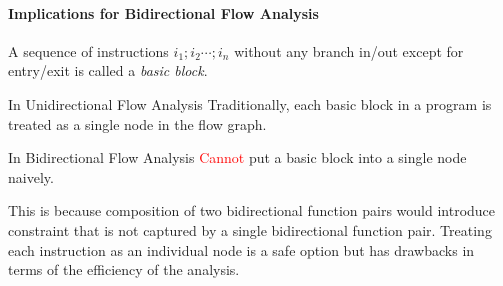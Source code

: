 \documentclass{llncs}
\newcommand{\Pow}{\mathcal{P}}
\newcommand{\tomon}{\to_{\mathrm{mon}}}
\newcommand{\red}[1]{\textcolor{red}{#1}}
\begin{document}
  \paragraph{Implications for Bidirectional Flow Analysis}
  A sequence of instructions $i_{1};i_{2}\cdots;i_{n}$ without any branch in/out except for entry/exit is called a \emph{basic block}.


  In Unidirectional Flow Analysis
    Traditionally, each basic block in a program is treated as a single node in the flow graph.
 
  In Bidirectional Flow Analysis
    \red{Cannot} put a basic block into a single node naively.

  This is because composition of two bidirectional function pairs would introduce constraint that is not captured by a single bidirectional function pair. Treating each instruction as an individual node is a safe option but has drawbacks in terms of the efficiency of the analysis.



% 

%
% 
\end{document}
